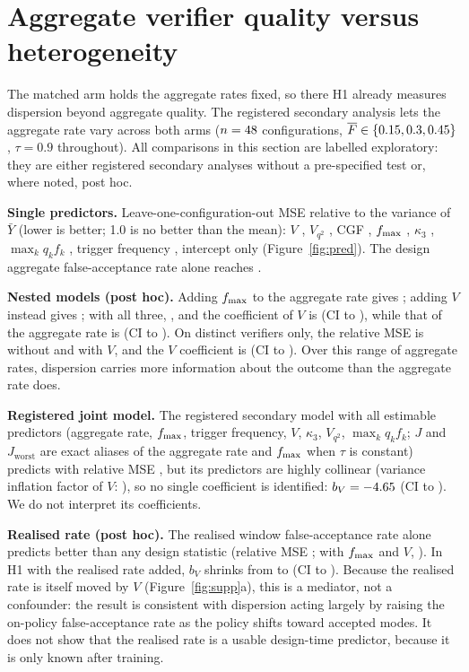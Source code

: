 \section{Aggregate verifier quality versus heterogeneity}\label{sec:aggregate}
The matched arm holds the aggregate rates fixed, so there H1 already measures dispersion beyond aggregate quality. The registered secondary analysis lets the aggregate rate vary across both arms ($n=48$ configurations, $\overline{F}\in\{0.15,0.3,0.45\}$, $\tau=0.9$ throughout). All comparisons in this section are labelled exploratory: they are either registered secondary analyses without a pre-specified test or, where noted, post hoc.

\textbf{Single predictors.} Leave-one-configuration-out MSE relative to the variance of $\bar Y$ (lower is better; 1.0 is no better than the mean): $V$ \RelV, $V_{q^2}$ \RelVqtwo, CGF \RelCGF, $f_{\max}$ \RelFmax, $\kappa_3$ \RelKappa, $\max_k q_kf_k$ \RelMaxqf, trigger frequency \RelTrig, intercept only \RelNull{} (Figure~\ref{fig:pred}). The design aggregate false-acceptance rate alone reaches \RelAggF.

\textbf{Nested models (post hoc).} Adding $f_{\max}$ to the aggregate rate gives \RelAggFM; adding $V$ instead gives \RelAggFV; with all three, \RelAggFMV, and the coefficient of $V$ is \AggFMVcoefV{} (CI \AggFMVcoefVLo{} to \AggFMVcoefVHi), while that of the aggregate rate is \AggFMVcoefF{} (CI \AggFMVcoefFLo{} to \AggFMVcoefFHi). On distinct verifiers only, the relative MSE is \UniqRelFM{} without and \UniqRelFMV{} with $V$, and the $V$ coefficient is \UniqAggV{} (CI \UniqAggVLo{} to \UniqAggVHi). Over this range of aggregate rates, dispersion carries more information about the outcome than the aggregate rate does.

\textbf{Registered joint model.} The registered secondary model with all estimable predictors (aggregate rate, $f_{\max}$, trigger frequency, $V$, $\kappa_3$, $V_{q^2}$, $\max_k q_kf_k$; $J$ and $J_{\text{worst}}$ are exact aliases of the aggregate rate and $f_{\max}$ when $\tau$ is constant) predicts with relative MSE \SecRel, but its predictors are highly collinear (variance inflation factor of $V$: \SecVifV), so no single coefficient is identified: $b_V=-4.65$ (CI \SecVLo{} to \SecVHi). We do not interpret its coefficients.

\textbf{Realised rate (post hoc).} The realised window false-acceptance rate alone predicts better than any design statistic (relative MSE \RelAggR; with $f_{\max}$ and $V$, \RelAggRMV). In H1 with the realised rate added, $b_V$ shrinks from \HoneBV{} to \MedBV{} (CI \MedBVLo{} to \MedBVHi). Because the realised rate is itself moved by $V$ (Figure~\ref{fig:supp}a), this is a mediator, not a confounder: the result is consistent with dispersion acting largely by raising the on-policy false-acceptance rate as the policy shifts toward accepted modes. It does not show that the realised rate is a usable design-time predictor, because it is only known after training.

